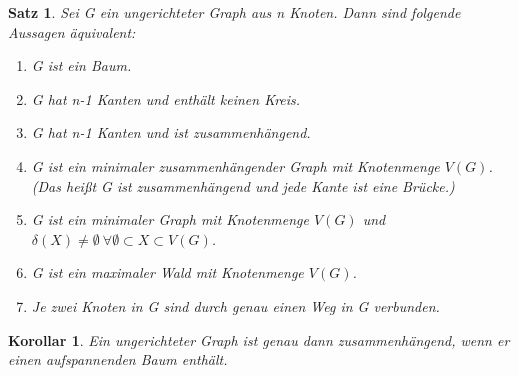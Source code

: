 \documentclass[12pt,a4paper]{article}
\theoremstyle{plain}
\newtheorem{Satz}[Theorem]{Satz}
\newtheorem{Korollar}[Theorem]{Korollar}
\numberwithin{equation}{section}
\begin{document}
\begin{Satz}
Sei G ein ungerichteter Graph aus n Knoten. Dann sind folgende Aussagen äquivalent:
\renewcommand{\labelenumi}{\emph{(\alph{enumi})}}
\begin{enumerate}
\item G ist ein Baum.
\item G hat n-1 Kanten und enthält keinen Kreis.
\item G hat n-1 Kanten und ist zusammenhängend.
\item G ist ein minimaler zusammenhängender Graph mit Knotenmenge $V(G)$. (Das heißt G ist zusammenhängend und jede Kante ist eine Brücke.)
\item G ist ein minimaler Graph mit Knotenmenge $V(G)$ und $\delta(X)\neq \emptyset\ \forall \emptyset\subset X\subset V(G)$.
\item G ist ein maximaler Wald mit Knotenmenge $V(G)$.
\item Je zwei Knoten in G sind durch genau einen Weg in G verbunden.
\end{enumerate}
\end{Satz}
\begin{Korollar}
Ein ungerichteter Graph ist genau dann zusammenhängend, wenn er einen aufspannenden Baum enthält.
\end{Korollar}
\end{document}
